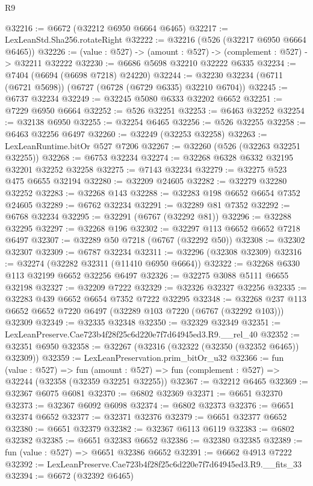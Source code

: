 \begin{lexlean}{R9}
\begin{coremodule}
@32216 := @6672 (@32212 @6950 @6664 @6465)
@32217 := LexLeanStd.Sha256.rotateRight
@32222 := @32216 (@526 (@32217 @6950 @6664 @6465))
@32226 := (value : @527) -> (amount : @527) -> (complement : @527) -> @32211 @32222
@32230 := @6686 @5698 @32210 @32222 @6335
@32234 := @7404 (@6694 (@6698 @7218) @24220)
@32244 := @32230 @32234 (@6711 (@6721 @5698)) (@6727 (@6728 (@6729 @6335) @32210 @6704))
@32245 := @6737 @32234
@32249 := @32245 @5080 @6333 @32202 @6652
@32251 := @7229 @6950 @6664
@32252 := @526 @32251
@32253 := @6463 @32252
@32254 := @32138 @6950
@32255 := @32254 @6465
@32256 := @526 @32255
@32258 := @6463 @32256 @6497
@32260 := @32249 (@32253 @32258)
@32263 := LexLeanRuntime.bitOr @527 @7206
@32267 := @32260 (@526 (@32263 @32251 @32255))
@32268 := @6753 @32234
@32274 := @32268 @6328 @6332 @32195 @32201 @32252 @32258
@32275 := @7143 @32234
@32279 := @32275 @523 @475 @6655 @32194
@32280 := @32209 @24605
@32282 := @32279 @32280 @32252
@32283 := @32268 @143
@32288 := @32283 @198 @6652 @6654 @7352 @24605
@32289 := @6762 @32234
@32291 := @32289 @81 @7352
@32292 := @6768 @32234
@32295 := @32291 (@6767 (@32292 @81))
@32296 := @32288 @32295
@32297 := @32268 @196
@32302 := @32297 @113 @6652 @6652 @7218 @6497
@32307 := @32289 @50 @7218 (@6767 (@32292 @50))
@32308 := @32302 @32307
@32309 := @6787 @32234
@32311 := @32296 (@32308 @32309)
@32316 := @32274 (@32282 @32311 (@11410 @6950 @6664))
@32322 := @32268 @6330 @113 @32199 @6652 @32256 @6497
@32326 := @32275 @3088 @5111 @6655 @32198
@32327 := @32209 @7222
@32329 := @32326 @32327 @32256
@32335 := @32283 @439 @6652 @6654 @7352 @7222 @32295
@32348 := @32268 @237 @113 @6652 @6652 @7220 @6497 (@32289 @103 @7220 (@6767 (@32292 @103))) @32309
@32349 := @32335 @32348
@32350 := @32329 @32349
@32351 := LexLeanPreserve.Cae723b4f28f25c6d220e7f7d64945ed3.R9.__rel_40
@32352 := @32351 @6950
@32358 := @32267 (@32316 (@32322 (@32350 (@32352 @6465)) @32309))
@32359 := LexLeanPreservation.prim_bitOr_u32
@32366 := fun (value : @527) =>
  fun (amount : @527) => fun (complement : @527) => @32244 (@32358 (@32359 @32251 @32255))
@32367 := @32212 @6465
@32369 := @32367 @6075 @6081
@32370 := @6802 @32369
@32371 := @6651 @32370
@32373 := @32367 @6092 @6098
@32374 := @6802 @32373
@32376 := @6651 @32374 @6652
@32377 := @32371 @32376
@32379 := @6651 @32377 @6652
@32380 := @6651 @32379
@32382 := @32367 @6113 @6119
@32383 := @6802 @32382
@32385 := @6651 @32383 @6652
@32386 := @32380 @32385
@32389 := fun (value : @527) => @6651 @32386 @6652
@32391 := @6662 @4913 @7222
@32392 := LexLeanPreserve.Cae723b4f28f25c6d220e7f7d64945ed3.R9.__fits_33
@32394 := @6672 (@32392 @6465)

\end{coremodule}
\end{lexlean}
